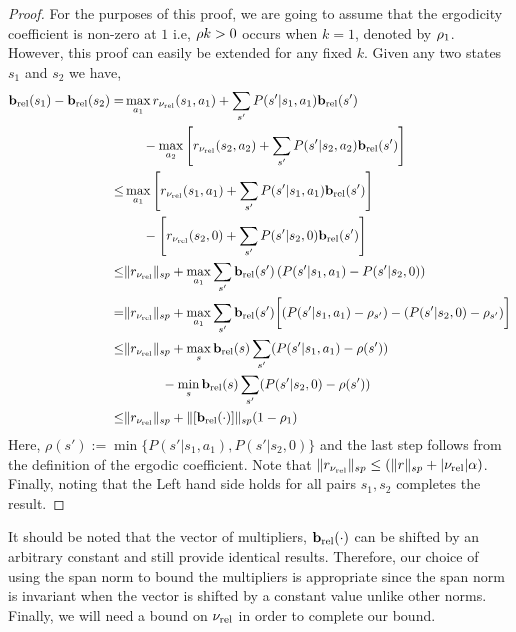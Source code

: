 \begin{proof}
For the purposes of this proof, we are going to assume that the ergodicity coefficient is non-zero at $1$ i.e,  $\rho{k} > 0$ occurs when $k = 1$, denoted by $\rho_{1}$. However, this proof can easily be extended for any fixed $k$. Given any two states $s_1$ and $s_2$ we have,
   \begin{align*}
       \mathbf{b}_{\text{rel}}(s_1) - \mathbf{b}_{\text{rel}}(s_2) =& \max_{a_1} r_{\mathbf{\nu_{\text{rel}}}}(s_1, a_1) + \sum_{s'} P(s'|s_1, a_1) \mathbf{b}_{\text{rel}}(s')\\
       &\hspace{0.2 in}- \max_{a_2} \left[r_{\mathbf{\nu_{\text{rel}}}}(s_2, a_2) + \sum_{s'} P(s'|s_2, a_2) \mathbf{b}_{\text{rel}}(s')\right]\\
       \leq& \max_{a_1} \left[r_{\mathbf{\nu_{\text{rel}}}}(s_1, a_1) + \sum_{s'} P(s'|s_1, a_1) \mathbf{b}_{\text{rel}}(s')\right]\\
       &\hspace{0.2 in}- \left[r_{\mathbf{\nu_{\text{rel}}}}(s_2, 0) + \sum_{s'} P(s'|s_2, 0)\mathbf{b}_{\text{rel}}(s')\right]\\
       \leq& \|r_{\mathbf{\nu_{\text{rel}}}}\|_{sp} + \max_{a_1}\sum_{s'}\mathbf{b}_{\text{rel}}(s')\left(P(s'|s_1, a_1) - P(s'|s_2, 0)\right)\\
       =& \|r_{\mathbf{\nu_{\text{rel}}}}\|_{sp} + \max_{a_1}\sum_{s'}\mathbf{b}_{\text{rel}}(s')\bigg[(P(s'|s_1, a_1) - \rho_{s'}) - (P(s'|s_2, 0) - \rho_{s'})\bigg]\\
       \leq& \|r_{\mathbf{\nu_{\text{rel}}}}\|_{sp} + \max_{s}\mathbf{b}_{\text{rel}}(s) \sum_{s'} (P(s'|s_1, a_1) - \rho(s'))\\
       &\hspace{0.4 in}- \min_{s}\mathbf{b}_{\text{rel}}(s) \sum_{s'}(P(s'|s_2, 0) - \rho(s'))\\
       \leq& \|r_{\mathbf{\nu_{\text{rel}}}}\|_{sp} + \|[\mathbf{b}_{\text{rel}}(\cdot)]\|_{sp}(1 - \rho_{1})
   \end{align*}
   Here, $\rho(s') := \min\{P(s'|s_1, a_1), P(s'|s_2, 0)\}$ and the last step follows from the definition of the ergodic coefficient. Note that $\|r_{\mathbf{\nu_{\text{rel}}}}\|_{sp} \leq ( \|r\|_{sp} + |\mathbf{\nu_{\text{rel}}}| \alpha)$. Finally, noting that the Left hand side holds for all pairs $s_1, s_2$ completes the result. 
\end{proof}

It should be noted that the vector of multipliers, $\mathbf{b}_{\text{rel}}(\cdot)$ can be shifted by an arbitrary constant and still provide identical results. Therefore, our choice of using the span norm to bound the multipliers is appropriate since the span norm is invariant when the vector is shifted by a constant value unlike other norms.
Finally, we will need a bound on $\mathbf{\nu_{\text{rel}}}$ in order to complete our bound.

